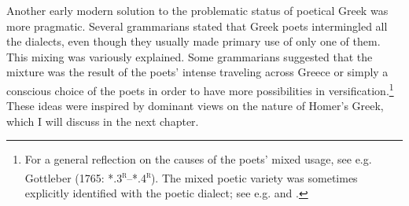Another early modern solution to the problematic status of poetical Greek was more pragmatic. Several grammarians stated that Greek poets intermingled all the dialects, even though they usually made primary use of only one of them. This mixing was variously explained. Some grammarians suggested that the mixture was the result of the poets’ intense traveling across Greece or simply a conscious choice of the poets in order to have more possibilities in versification.\footnote{For a general reflection on the causes of the poets’ mixed usage, see e.g. Gottleber (1765: *.3\textsc{\textsuperscript{r}}–*.4\textsc{\textsuperscript{r}}). The mixed poetic variety was sometimes explicitly identified with the poetic dialect; see e.g. \citet[111]{Bayly1756} and \citet[198]{Peternader1776}.} These ideas were inspired by dominant views on the nature of Homer’s Greek, which I will discuss in the next chapter.

